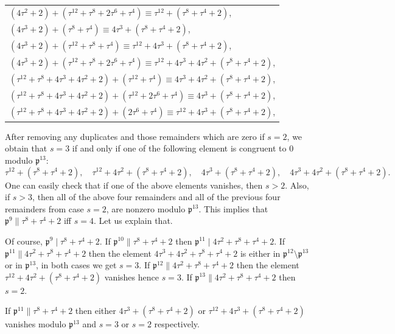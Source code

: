 \documentclass[12pt]{article}
\theoremstyle{remark}
\newcommand{\p}{\mathfrak{p}}
\begin{document}
\begin{center}
\begin{tabular}{@{}l@{}}
    
    $(4\tau^2+2) + (\tau^{12}+\tau^8+2\tau^6+\tau^4) \equiv \tau^{12}+(\tau^8+\tau^4+2) $, \\
    $(4\tau^3+2) + (\tau^8+\tau^4) \equiv 4\tau^3+(\tau^8+\tau^4+2) $, \\
    $(4\tau^3+2) + (\tau^{12}+\tau^8+\tau^4) \equiv \tau^{12}+4\tau^3+(\tau^8+\tau^4+2) $, \\
    
    $(4\tau^3+2) + (\tau^{12}+\tau^8+2\tau^6+\tau^4) \equiv \tau^{12}+4\tau^3+4\tau^2+(\tau^8+\tau^4+2) $, \\
    $(\tau^{12}+\tau^8+4\tau^3+4\tau^2+2) + (\tau^{12}+\tau^4) \equiv 4\tau^3+4\tau^2 +(\tau^8+\tau^4+2)$, \\
    $(\tau^{12}+\tau^8+4\tau^3+4\tau^2+2) + (\tau^{12}+2\tau^6+\tau^4)  \equiv 4\tau^3+(\tau^8+\tau^4+2) $, \\
    $(\tau^{12}+\tau^8+4\tau^3+4\tau^2+2) + (2\tau^6+\tau^4)  \equiv \tau^{12} + 4\tau^3 + (\tau^8+\tau^4+2) $, \\
\end{tabular}
\end{center}
After removing any duplicates and those remainders which are zero if $s=2$, we obtain that $s=3$ if and only if one of the following element is congruent to 0 modulo $\mathfrak{p}^{13}$:
\[ \tau^{12}+ (\tau^8+\tau^4+2), \quad \tau^{12}+4\tau^2 + (\tau^8+\tau^4+2), \quad 4\tau^3+(\tau^8+\tau^4+2), \quad 4\tau^3+4\tau^2
+ (\tau^8+\tau^4+2).\]
One can easily check that if one of the above elements vanishes, then $s >2$. Also, if $s>3$, then all of the above four remainders and all of the previous four remainders from case $s=2$, are nonzero modulo $\mathfrak{p}^{13}$. This implies that $\mathfrak{p}^9 \parallel \tau^8+\tau^4+2$ iff $s=4$. Let us explain that.

Of course, $\mathfrak{p}^9 \mid \tau^8+\tau^4+2$. If $\mathfrak{p}^{10} \parallel \tau^8+\tau^4+2$ then $\p^{11} \mid 4\tau^2 +\tau^8+\tau^4+2$. If $\p^{11} \parallel4\tau^2 +\tau^8+\tau^4+2$ then the element $ 4\tau^3+4\tau^2 +\tau^8+\tau^4+2$ is either in $\p^{12}\setminus\p ^{13}$ or in $\p^{13}$, in both cases we get $s=3$. If $\p^{12} \parallel4\tau^2 +\tau^8+\tau^4+2$ then the element $\tau^{12}+4\tau^2 + (\tau^8+\tau^4+2)$ vanishes hence $s=3$. If $\p^{13} \parallel4\tau^2 +\tau^8+\tau^4+2$ then $s=2$.

If $\mathfrak{p}^{11} \parallel \tau^8+\tau^4+2$ then either $4\tau^3+(\tau^8+\tau^4+2)$ or $\tau^{12}+4\tau^3+(\tau^8+\tau^4+2)$ vanishes modulo $\p^{13}$ and $s=3$ or $s=2$ respectively.
\end{document}
